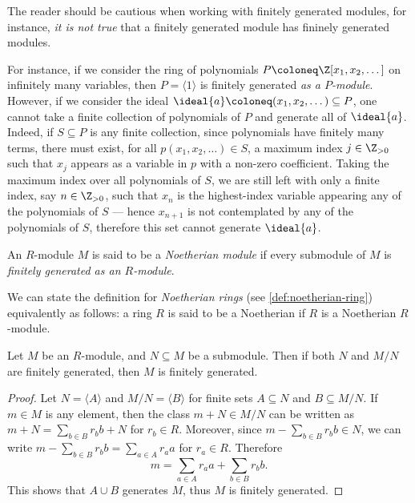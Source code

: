 \begin{remark}[Submodules]
\label{rem:submodules-finitely-generated}
The reader should be cautious when working with finitely generated modules, for
instance, \emph{it is not true} that a finitely generated module has fininely
generated modules.

For instance, if we consider the ring of polynomials
\(P \coloneq \Z[x_1, x_2, \dots]\) on infinitely many variables, then
\(P = \langle 1 \rangle\) is finitely generated \emph{as a
  \(P\)-module}. However, if we consider the ideal
\(\ideal{a} \coloneq (x_1, x_2, \dots) \subseteq P\), one cannot take a finite
collection of polynomials of \(P\) and generate all of \(\ideal{a}\). Indeed, if
\(S \subseteq P\) is any finite collection, since polynomials have finitely many
terms, there must exist, for all \(p(x_1, x_2, \dots) \in S\), a maximum index
\(j \in \Z_{>0}\) such that \(x_j\) appears as a variable in \(p\) with a
non-zero coefficient. Taking the maximum index over all polynomials of \(S\), we
are still left with only a finite index, say \(n \in \Z_{>0}\), such that
\(x_n\) is the highest-index variable appearing any of the polynomials of \(S\)
--- hence \(x_{n+1}\) is not contemplated by any of the polynomials of \(S\),
therefore this set cannot generate \(\ideal{a}\).
\end{remark}

\begin{definition}
\label{def:noetherian-module}
An \(R\)-module \(M\) is said to be a \emph{Noetherian module} if every
submodule of \(M\) is \emph{finitely generated as an \(R\)-module}.
\end{definition}

We can state the definition for \emph{Noetherian rings} (see
\cref{def:noetherian-ring}) equivalently as follows: a ring \(R\) is said to be
a Noetherian if \(R\) is a Noetherian \(R\)-module.

\begin{lemma}
\label{lem:finitely-generated-from-submodule}
Let \(M\) be an \(R\)-module, and \(N \subseteq M\) be a submodule. Then if both
\(N\) and \(M/N\) are finitely generated, then \(M\) is finitely generated.
\end{lemma}

\begin{proof}
Let \(N = \langle A \rangle\) and \(M/N = \langle B \rangle\) for finite sets
\(A \subseteq N\) and \(B \subseteq M/N\). If \(m \in M\) is any element, then
the class \(m + N \in M/N\) can be written as
\(m + N = \sum_{b \in B} r_b b + N\) for \(r_b \in R\). Moreover, since
\(m - \sum_{b \in B} r_b b \in N\), we can write
\(m - \sum_{b \in B} r_b b = \sum_{a \in A} r_a a\) for \(r_a \in R\). Therefore
\[
m = \sum_{a \in A} r_a a + \sum_{b \in B} r_b b.
\]
This shows that \(A \cup B\) generates \(M\), thus \(M\) is finitely generated.
\end{proof}

